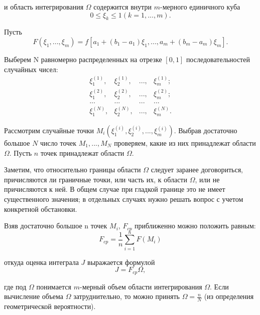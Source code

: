 \documentclass{report}
\begin{document}
\par и область интегрирования $\Omega$ содержится внутри $m$-мерного единичного куба
\begin{equation}0 \leq \xi_{k} \leq 1 (k = 1, ... , m).\end{equation}
\par Пусть
\begin{equation}F(\xi_{1}, ... , \xi_{m}) = f[a_{1} + (b_{1} - a_{1})\xi_{1}, ... , a_{m} + (b_{m} - a_{m})\xi_{m}].\end{equation}
\par Выберем N равномерно распределенных на отрезке $[0, 1]$ последовательностей случайных чисел:
\begin{equation}
\begin{matrix} 
\xi_{1}^{(1)}, & \xi_{2}^{(1)}, & ..., & \xi_{m}^{(1)};\\
\xi_{1}^{(2)}, & \xi_{2}^{(2)}, & ..., & \xi_{m}^{(2)};\\
... & ... & ... & ...\\
\xi_{1}^{(N)}, & \xi_{2}^{(N)}, & ..., & \xi_{m}^{(N)}.
\end{matrix}
\end{equation}
\par Рассмотрим случайные точки $M_{i}(\xi_{1}^{(i)}, \xi_{2}^{(i)}, ..., \xi_{m}^{(i)})$. Выбрав достаточно большое $N$ число точек $M_{1}, . . . , M_{N}$ проверяем, какие из них принадлежат
области $\Omega$. Пусть $n$ точек принадлежат области $\Omega$.
\par Заметим, что относительно границы области $\Omega$ следует заранее договориться, причисляются ли граничные точки, или часть их, к области $\Omega$, или не причисляются к ней. В общем случае при гладкой границе это не имеет существенного значения; в отдельных случаях нужно решать вопрос с учетом конкретной обстановки.
\par Взяв достаточно большое n точек $M_{i}$, $F_{cp}$ приближенно можно положить равным:
\begin{equation}F_{cp} = \frac{1}{n} \sum_{i=1}^{n}{F(M_{i})} \end{equation}
\par откуда оценка интеграла $J$ выражается формулой 
\begin{equation}J = F_{cp} \Omega ,\end{equation}
\par где под $\Omega$ понимается $m$-мерный объем области интегрирования $\Omega$. Если вычисление объема $\Omega$ затруднительно, то можно принять $\Omega = \frac {n}{N}$ (из определения геометрической вероятности).
\end{document}
